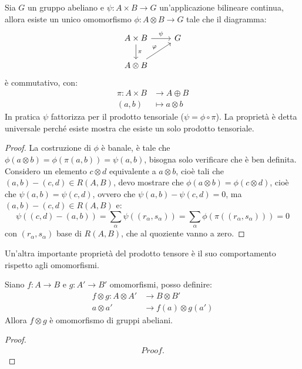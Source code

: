 \begin{proposition}
  Sia $ G $ un gruppo abeliano e $ \psi \colon A \times B \to G $ un'applicazione bilineare continua,
  allora esiste un unico omomorfismo $ \phi \colon A \otimes B \to G $ tale che il diagramma:
  \[
    \begin{tikzcd}
      A \times B \rar{\psi} \dar{\pi} & G \\
      A \otimes B \arrow{ru}{\phi} & {}
    \end{tikzcd}
  \]
  è commutativo, con:
  \begin{align*}
    \pi \colon A \times B & \to A \oplus B \\
    (a,b) & \mapsto a \otimes b
  \end{align*}
  In pratica $ \psi $ fattorizza per il prodotto tensoriale
  ($ \psi = \phi \circ \pi $). La proprietà è detta universale perché esiste mostra che
  esiste un solo prodotto tensoriale.
\end{proposition}
\begin{proof}
  La costruzione di $ \phi $ è banale, è tale che $ \phi(a \otimes b) = \phi(\pi(a,b)) = \psi(a,b) $,
  bisogna solo verificare che è ben definita.
  Considero un elemento $ c \otimes d $ equivalente a $ a \otimes b $, cioè tali
  che $ (a,b) - (c,d) \in R(A,B) $, devo mostrare che $ \phi(a \otimes b) = \phi(c \otimes d) $,
  cioè che $ \psi(a,b) = \psi(c,d) $, ovvero che $ \psi(a,b) - \psi(c,d) = 0 $, ma
  $ (a,b) - (c,d) \in R(A,B) $ e:
  \[
    \psi((c,d) - (a,b)) = \sum_\alpha \psi((r_\alpha, s_\alpha)) = \sum_\alpha \phi(\pi((r_\alpha, s_\alpha))) = 0
  \]
  con $ (r_\alpha,s_\alpha) $ base di $ R(A,B) $, che al quoziente vanno a zero.
\end{proof}

Un'altra importante proprietà del prodotto tensore è il suo comportamento
rispetto agli omomorfismi.

\begin{proposition}
  Siano $ f \colon A \to B $ e $ g \colon A' \to B' $ omomorfismi, posso definire:
  \begin{align*}
    f \otimes g \colon A \otimes A' & \to B \otimes B' \\
    a \otimes a' & \to f(a) \otimes g(a')
  \end{align*}
  Allora $ f \otimes g $ è omomorfismo di gruppi abeliani.
\end{proposition}
\begin{proof}
  \begin{gather*}
    Proof.
  \end{gather*}
\end{proof}

